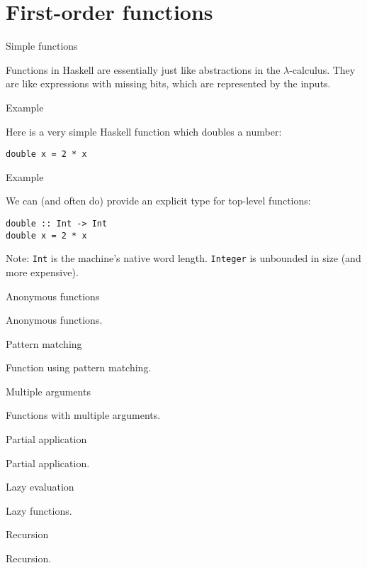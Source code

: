 
\section{First-order functions}

%
\begin{frame}[fragile]{Simple functions}

Functions in Haskell are essentially just like abstractions in the
$\lambda$-calculus. They are like expressions with missing bits, which are
represented by the inputs.

\end{frame}

%
\begin{frame}[fragile]{Example}

Here is a very simple Haskell function which doubles a number:

\begin{verbatim}
double x = 2 * x
\end{verbatim}

\end{frame}

%
\begin{frame}[fragile]{Example}

We can (and often do) provide an explicit type for top-level functions:

\begin{verbatim}
double :: Int -> Int
double x = 2 * x
\end{verbatim}

Note: \texttt{Int} is the machine's native word length. \texttt{Integer} is
unbounded in size (and more expensive).

\end{frame}

%
\begin{frame}[fragile]{Anonymous functions}

Anonymous functions.

\end{frame}

%
\begin{frame}[fragile]{Pattern matching}

Function using pattern matching.

\end{frame}

%
\begin{frame}[fragile]{Multiple arguments}

Functions with multiple arguments.

\end{frame}

%
\begin{frame}[fragile]{Partial application}

Partial application.

\end{frame}

%
\begin{frame}[fragile]{Lazy evaluation}

Lazy functions.

\end{frame}

%
\begin{frame}[fragile]{Recursion}

Recursion.

\end{frame}

